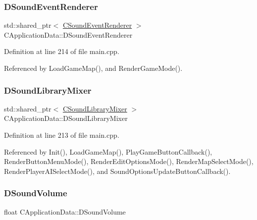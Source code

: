 \subsubsection{\texorpdfstring{D\+Sound\+Event\+Renderer}{DSoundEventRenderer}}
{\footnotesize\ttfamily std\+::shared\+\_\+ptr$<$ \hyperlink{classCSoundEventRenderer}{C\+Sound\+Event\+Renderer} $>$ C\+Application\+Data\+::\+D\+Sound\+Event\+Renderer\hspace{0.3cm}{\ttfamily [protected]}}



Definition at line 214 of file main.\+cpp.



Referenced by Load\+Game\+Map(), and Render\+Game\+Mode().

\hypertarget{classCApplicationData_aa1e6876121bb4fb229ec6b930a8a6766}{}\label{classCApplicationData_aa1e6876121bb4fb229ec6b930a8a6766} 
\subsubsection{\texorpdfstring{D\+Sound\+Library\+Mixer}{DSoundLibraryMixer}}
{\footnotesize\ttfamily std\+::shared\+\_\+ptr$<$ \hyperlink{classCSoundLibraryMixer}{C\+Sound\+Library\+Mixer} $>$ C\+Application\+Data\+::\+D\+Sound\+Library\+Mixer\hspace{0.3cm}{\ttfamily [protected]}}



Definition at line 213 of file main.\+cpp.



Referenced by Init(), Load\+Game\+Map(), Play\+Game\+Button\+Callback(), Render\+Button\+Menu\+Mode(), Render\+Edit\+Options\+Mode(), Render\+Map\+Select\+Mode(), Render\+Player\+A\+I\+Select\+Mode(), and Sound\+Options\+Update\+Button\+Callback().

\hypertarget{classCApplicationData_aa6e540f860dcb1929ef36ddce3be3691}{}\label{classCApplicationData_aa6e540f860dcb1929ef36ddce3be3691} 
\subsubsection{\texorpdfstring{D\+Sound\+Volume}{DSoundVolume}}
{\footnotesize\ttfamily float C\+Application\+Data\+::\+D\+Sound\+Volume\hspace{0.3cm}{\ttfamily [protected]}}



